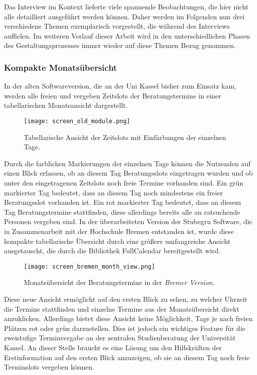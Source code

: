 Das Interview im Kontext lieferte viele spannende Beobachtungen, die hier nicht
alle detailliert ausgeführt werden können. Daher werden im Folgenden nun drei
verschiedene Themen exemplarisch vorgestellt, die während des Interviews
auffielen. Im weiteren Verlauf dieser Arbeit wird in den unterschiedlichen
Phasen des Gestaltungsprozesses immer wieder auf diese Themen Bezug genommen.

\subsubsection{Kompakte Monatsübersicht}
In der alten Softwareversion, die an der Uni Kassel bisher zum Einsatz kam,
werden alle freien und vergeben Zeitslots der Beratungstermine in einer
tabellarischen Monatsansicht dargestellt.

\begin{figure}[H]
    \caption{Tabellarische Ansicht der Zeitslots mit Einfärbungen der einzelnen Tage.}
    \centering
    \texttt{[image: screen\_old\_module.png]}
\end{figure}

Durch die farblichen Markierungen der einzelnen Tage können die Nutzenden auf
einen Blick erfassen, ob an diesem Tag Beratungsslots eingetragen wurden und ob
unter den eingetragenen Zeitslots noch freie Termine vorhanden sind. Ein grün
markierter Tag bedeutet, dass an diesem Tag noch mindestens ein freier
Beratungsslot vorhanden ist. Ein rot markierter Tag bedeutet, dass an diesem
Tag Beratungstermine stattfinden, diese allerdings bereits alle an ratsuchende
Personen vergeben sind. In der überarbeiteten Version der Stubegru Software,
die in Zusammenarbeit mit der Hochschule Bremen entstanden ist, wurde diese
kompakte tabellarische Übersicht durch eine größere umfangreiche Ansicht
ausgetauscht, die durch die Bibliothek \gls{FullCalendar} bereitgestellt wird.

\begin{figure}[H]
    \caption{Monatsübersicht der Beratungstermine in der \textit{Bremer Version}.}
    \centering
    \texttt{[image: screen\_bremen\_month\_view.png]}
\end{figure}

Diese neue Ansicht ermöglicht auf den ersten Blick zu sehen, zu welcher Uhrzeit
die Termine stattfinden und einzelne Termine aus der Monatsübersicht direkt
anzuklicken. Allerdings bietet diese Ansicht keine Möglichkeit, Tage je nach
freien Plätzen rot oder grün darzustellen. Dies ist jedoch ein wichtiges
Feature für die zweistufige Terminvergabe an der zentralen Studienberatung der
Universität Kassel. An dieser Stelle braucht es eine Lösung um den Hilfskräften
der Erstinformation auf den ersten Blick anzuzeigen, ob sie an diesem Tag noch
freie Terminslots vergeben können.

